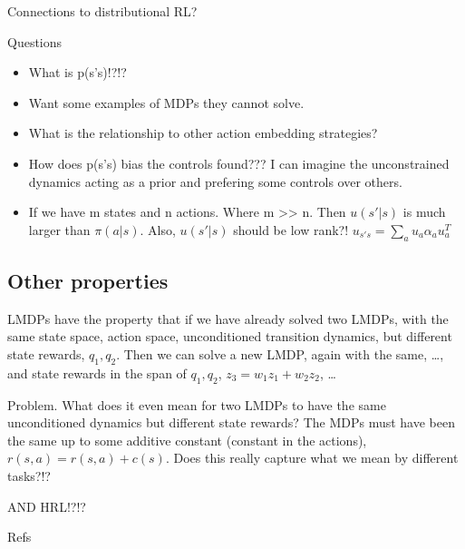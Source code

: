 Connections to distributional RL?

Questions

\begin{itemize}
\tightlist
\item
  What is p(s'\textbar{}s)!?!?
\item
  Want some examples of MDPs they cannot solve.
\item
  What is the relationship to other action embedding strategies?
\item
  How does p(s'\textbar{}s) bias the controls found??? I can imagine the
  unconstrained dynamics acting as a prior and prefering some controls
  over others.
\item
  If we have m states and n actions. Where m
  \textgreater{}\textgreater{} n. Then \(u(s'|s)\) is much larger than
  \(\pi(a|s)\). Also, \(u(s'|s)\) should be low rank?!
  \(u_{s's} = \sum_a u_a \alpha_a u_a^T\)
\end{itemize}

\hypertarget{other-properties}{%
\subsection{Other properties}\label{other-properties}}

LMDPs have the property that if we have already solved two LMDPs, with
the same state space, action space, unconditioned transition dynamics,
but different state rewards, \(q_1, q_2\). Then we can solve a new LMDP,
again with the same, \ldots{}, and state rewards in the span of
\(q_1, q_2\), \(z_3 = w_1 z_1 + w_2 z_2\), \ldots{}

Problem. What does it even mean for two LMDPs to have the same
unconditioned dynamics but different state rewards? The MDPs must have
been the same up to some additive constant (constant in the actions),
\(r(s, a)=r(s, a) + c(s)\). Does this really capture what we mean by
different tasks?!?

AND HRL!?!?

Refs \cite{Todorov2006,Todorov2009,Zhong,Zhonga,Dvijotham,Wozabal}
